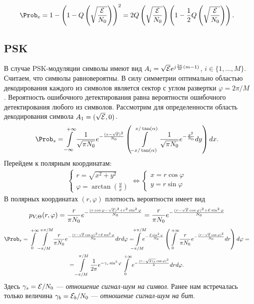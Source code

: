 \documentclass{book}
\numberwithin{theorem}{chapter}
\numberwithin{statement}{chapter}
\numberwithin{lemma}{chapter}
\theoremstyle{definition}
\numberwithin{task}{chapter}
\theoremstyle{remark}
\numberwithin{example}{chapter}
\theoremstyle{definition}
\numberwithin{definition}{chapter}
\theoremstyle{remark}
\theoremstyle{remark}
\numberwithin{lyrics}{section}
\begin{document}
$$
\Prob_e = 1 - \left(1 - Q\left(\sqrt{\frac{\Energy}{N_0}}\right)\right)^2 = 2Q\left(\sqrt{\frac{\Energy}{N_0}}\right)\left(1 - \frac{1}{2} Q\left(\sqrt{\frac{\Energy}{N_0}}\right) \right).
$$

\subsection{PSK}
В случае PSK-модуляции символы имеют вид $A_i = \sqrt{\mathcal{E}} e^{j\frac{2\pi}{M}(m-1)}$, $i \in \{1, \dots, M\}$. Считаем, что символы равновероятны. В силу симметрии оптимально областью декодирования каждого из символов является сектор с углом развертки $\varphi = 2\pi / M$. Вероятность ошибочного детектирования равна вероятности ошибочного детектирования любого из символов. Рассмотрим для определенности область декодирования символа $A_1 = (\sqrt{\mathcal{E}}, 0)$. 
$$
\Prob_s = \Int_{-\infty}^{+\infty} \frac{1}{\sqrt{\pi N_0}} e^{-\frac{(x - \sqrt{\Energy})^2}{N_0}}\left(\Int_{-x / \tan(\alpha)}^{x / \tan(\alpha)} \frac{1}{\sqrt{\pi N_0}} e^{-\frac{y^2}{N_0}} dy\right) dx.
$$
Перейдем к полярным координатам:
\begin{gather*}
\begin{cases}
r = \sqrt{x^2 + y^2} \\
\varphi = \arctan \left( \frac{y}{x} \right)
\end{cases}
\Leftrightarrow
\begin{cases}
x = r \cos \varphi \\
y = r \sin \varphi
\end{cases}
\end{gather*}
В полярных координатах $(r, \varphi)$ плотность вероятности имеет вид
$$
p_{V,\Theta}(r, \varphi) = \frac{r}{\pi N_0} e^{-\frac{(r\cos \varphi - \sqrt{\mathcal{E}})^2 + r^2 \sin^2 \varphi}{N_0}} =
\frac{r}{\pi N_0} e^{-\frac{(r - \sqrt{\mathcal{E}} \cos \varphi)^2 + \mathcal{E} \sin^2 \varphi}{N_0}}
$$
\begin{gather*}
\Prob_s = %
\Int_{0}^{+\infty} \Int_{-\pi/M}^{+\pi/M} \frac{r}{\pi N_0} e^{-\frac{(r - \sqrt{\Energy} \cos \varphi)^2 + \Energy \sin^2 \varphi}{N_0}} dr d\varphi = \Int_{\mathclap{-\pi/M}}^{\mathclap{+\pi/M}} e^{-\frac{\Energy \sin^2 \varphi}{N_0}} \left(\Int_{0}^{+\infty}  \frac{r}{\pi N_0} e^{-\frac{(r - \sqrt{\Energy} \cos \varphi)^2}{N_0}} dr\right) d \varphi = \\
= \Int_{-\pi /M }^{\pi / M}   \frac{1}{2\pi}  e^{-\gamma_s \sin^2 \varphi} \Int_{0}^{+\infty} e^{-\frac{(r - \sqrt{2\gamma_s} \cos \varphi)^2}{2}} dr d\varphi.
\end{gather*}
Здесь $\gamma_s = \mathcal{E}/N_0$ --- \textit{отношение сигнал-шум на символ}. Ранее нам встречалась только величина $\gamma_b = \mathcal{E}_b / N_0$ --- \textit{отношение сигнал-шум на бит}. 
\end{document}
